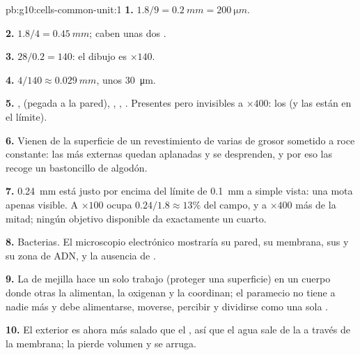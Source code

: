 \begin{solution}{pb:g10:cells-common-unit:1}
\textbf{1.} $1.8/9 = \qty{0.2}{mm} = \qty{200}{\micro m}$.

\textbf{2.} $1.8/4 = \qty{0.45}{mm}$; caben unas dos .

\textbf{3.} $28/0.2 = 140$: el dibujo es $\times 140$.

\textbf{4.} $4/140 \approx \qty{0.029}{mm}$, unos \qty{30}{\micro m}.

\textbf{5.} ,  (pegada a la pared),
, , . Presentes pero invisibles a $\times 400$:
los  (y las  están en el límite).

\textbf{6.} Vienen de la superficie de un revestimiento de varias
 de grosor sometido a roce constante: las  más externas
quedan aplanadas y se desprenden, y por eso las recoge un bastoncillo
de algodón.

\textbf{7.} \qty{0.24}{mm} está justo por encima del límite de
\qty{0.1}{mm} a simple vista: una mota apenas visible. A $\times 100$
ocupa $0.24/1.8 \approx 13\%$ del campo, y a $\times 400$ más de la
mitad; ningún objetivo disponible da exactamente un cuarto.

\textbf{8.} Bacterias. El microscopio electrónico mostraría su pared,
su membrana, sus  y su zona de ADN, y la ausencia de .

\textbf{9.} La  de mejilla hace un solo trabajo (proteger una
superficie) en un cuerpo donde otras  la alimentan, la oxigenan
y la coordinan; el paramecio no tiene a nadie más y debe alimentarse,
moverse, percibir y dividirse como una sola .

\textbf{10.} El exterior es ahora más salado que el , así que
el agua sale de la  a través de la membrana; la  pierde
volumen y se arruga.


\end{solution}
